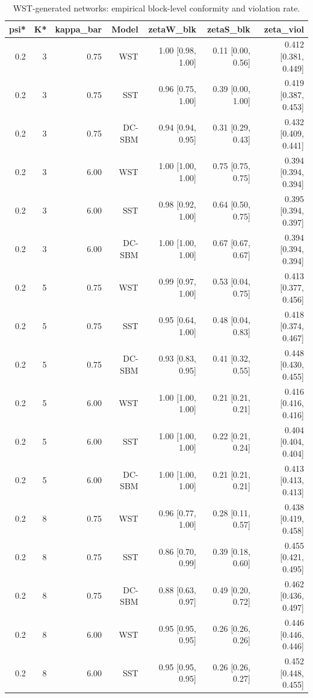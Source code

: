 \begin{table}[!h]
\centering
\caption{WST-generated networks: empirical block-level conformity and violation rate.\\\label{tab:order-wst-full-simulation-crossfit-final-DemoKvar-run-20260224-155823}}
\centering
\begin{tabular}[t]{rrrrrrr}
\toprule
psi* & K* & kappa_bar & Model & zetaW_blk & zetaS_blk & zeta_viol\\
\midrule
0.2 & 3 & 0.75 & WST & 1.00 [0.98, 1.00] & 0.11 [0.00, 0.56] & 0.412 [0.381, 0.449]\\
0.2 & 3 & 0.75 & SST & 0.96 [0.75, 1.00] & 0.39 [0.00, 1.00] & 0.419 [0.387, 0.453]\\
0.2 & 3 & 0.75 & DC-SBM & 0.94 [0.94, 0.95] & 0.31 [0.29, 0.43] & 0.432 [0.409, 0.441]\\
0.2 & 3 & 6.00 & WST & 1.00 [1.00, 1.00] & 0.75 [0.75, 0.75] & 0.394 [0.394, 0.394]\\
0.2 & 3 & 6.00 & SST & 0.98 [0.92, 1.00] & 0.64 [0.50, 0.75] & 0.395 [0.394, 0.397]\\
0.2 & 3 & 6.00 & DC-SBM & 1.00 [1.00, 1.00] & 0.67 [0.67, 0.67] & 0.394 [0.394, 0.394]\\
0.2 & 5 & 0.75 & WST & 0.99 [0.97, 1.00] & 0.53 [0.04, 0.75] & 0.413 [0.377, 0.456]\\
0.2 & 5 & 0.75 & SST & 0.95 [0.64, 1.00] & 0.48 [0.04, 0.83] & 0.418 [0.374, 0.467]\\
0.2 & 5 & 0.75 & DC-SBM & 0.93 [0.83, 0.95] & 0.41 [0.32, 0.55] & 0.448 [0.430, 0.455]\\
0.2 & 5 & 6.00 & WST & 1.00 [1.00, 1.00] & 0.21 [0.21, 0.21] & 0.416 [0.416, 0.416]\\
0.2 & 5 & 6.00 & SST & 1.00 [1.00, 1.00] & 0.22 [0.21, 0.24] & 0.404 [0.404, 0.404]\\
0.2 & 5 & 6.00 & DC-SBM & 1.00 [1.00, 1.00] & 0.21 [0.21, 0.21] & 0.413 [0.413, 0.413]\\
0.2 & 8 & 0.75 & WST & 0.96 [0.77, 1.00] & 0.28 [0.11, 0.57] & 0.438 [0.419, 0.458]\\
0.2 & 8 & 0.75 & SST & 0.86 [0.70, 0.99] & 0.39 [0.18, 0.60] & 0.455 [0.421, 0.495]\\
0.2 & 8 & 0.75 & DC-SBM & 0.88 [0.63, 0.97] & 0.49 [0.20, 0.72] & 0.462 [0.436, 0.497]\\
0.2 & 8 & 6.00 & WST & 0.95 [0.95, 0.95] & 0.26 [0.26, 0.26] & 0.446 [0.446, 0.446]\\
0.2 & 8 & 6.00 & SST & 0.95 [0.95, 0.95] & 0.26 [0.26, 0.27] & 0.452 [0.448, 0.455]\\

\end{tabular}
\end{table}
